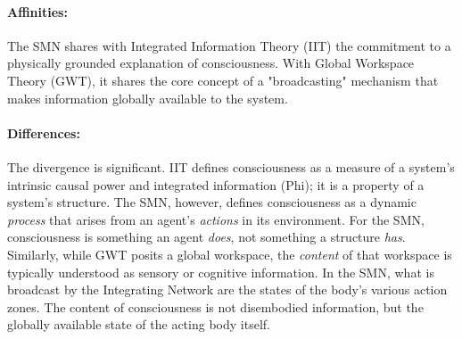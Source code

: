 \paragraph{Affinities:} The SMN shares with Integrated Information Theory (IIT) the commitment to a physically grounded explanation of consciousness. With Global Workspace Theory (GWT), it shares the core concept of a "broadcasting" mechanism that makes information globally available to the system.  \paragraph{Differences:} The divergence is significant. IIT defines consciousness as a measure of a system's intrinsic causal power and integrated information (Phi); it is a property of a system's structure. The SMN, however, defines consciousness as a dynamic \textit{process} that arises from an agent's \textit{actions} in its environment. For the SMN, consciousness is something an agent \textit{does}, not something a structure \textit{has}. Similarly, while GWT posits a global workspace, the \textit{content} of that workspace is typically understood as sensory or cognitive information. In the SMN, what is broadcast by the Integrating Network are the states of the body's various action zones. The content of consciousness is not disembodied information, but the globally available state of the acting body itself.
\begin{table}[ht]
\centering
\caption{A Comparative Summary of Cognitive Theories}
\label{tab:theory_comparison}
\end{table}